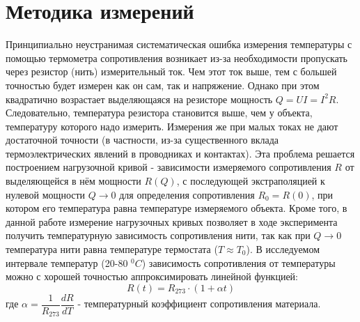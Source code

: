 \documentclass[a4paper, 12pt]{article}%
\begin{document}
\section*{Методика измерений} 
Принципиально неустранимая систематическая ошибка измерения температуры с помощью термометра сопротивления возникает из-за необходимости пропускать через резистор (нить) измерительный ток. Чем этот ток выше, тем с большей точностью будет измерен как он сам, так и напряжение. Однако при этом квадратично возрастает выделяющаяся на  резисторе мощность $Q = UI = I^2R$. Следовательно, температура резистора становится выше, чем у объекта, температуру которого надо измерить. Измерения же при малых токах не дают достаточной точности (в частности, из-за существенного вклада термоэлектрических явлений в проводниках и контактах). Эта проблема решается построением нагрузочной кривой - зависимости измеряемого сопротивления $R$ от выделяющейся в нём мощности $R(Q)$, с последующей экстраполяцией к нулевой мощности $Q \to 0$ для определения сопротивления $R_0 = R(0)$, при котором его температура равна температуре измеряемого объекта. Кроме того, в данной работе измерение нагрузочных кривых позволяет в ходе эксперимента получить температурную зависимость сопротивления нити, так как при $Q \to 0$ температура нити равна температуре термостата ($T \approx T_0$). В исследуемом интервале температур (20-80 $^0C$) зависимость сопротивления от температуры можно с хорошей точностью аппроксимировать линейной функцией:
\[R(t) = R_{273} \cdot (1 + \alpha t)\]
где $\alpha = \dfrac{1}{R_{273}} \dfrac{dR}{dT}$ - температурный коэффициент сопротивления материала.
\end{document}
